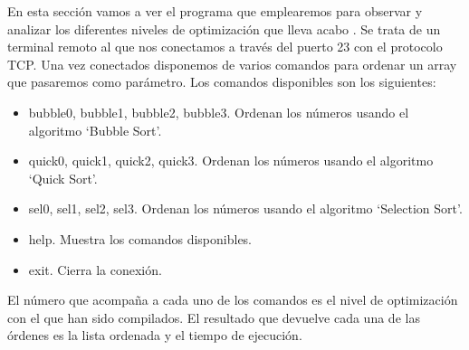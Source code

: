 En esta sección vamos a ver el programa que emplearemos para observar y analizar los diferentes niveles de optimización que lleva acabo . Se trata de un terminal remoto al que nos conectamos a través del puerto 23 con el protocolo TCP. Una vez conectados disponemos de varios comandos para ordenar un array que pasaremos como parámetro. Los comandos disponibles son los siguientes:

\begin{itemize}
	\item bubble0, bubble1, bubble2, bubble3. Ordenan los números usando el algoritmo `Bubble Sort'.
	\item quick0, quick1, quick2, quick3. Ordenan los números usando el algoritmo `Quick Sort'.
	\item sel0, sel1, sel2, sel3. Ordenan los números usando el algoritmo `Selection Sort'.
	\item help. Muestra los comandos disponibles.
	\item exit. Cierra la conexión.
\end{itemize}

El número que acompaña a cada uno de los comandos es el nivel de optimización con el que han sido compilados. El resultado que devuelve cada una de las órdenes es la lista ordenada y el tiempo de ejecución.
